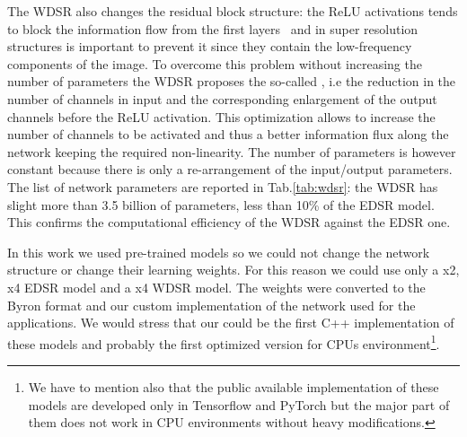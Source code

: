 \documentclass{standalone}
\begin{document}
The WDSR also changes the residual block structure: the ReLU activations tends to block the information flow from the first layers~\cite{mobilenet} and in super resolution structures is important to prevent it since they contain the low-frequency components of the image.
To overcome this problem without increasing the number of parameters the WDSR proposes the so-called , i.e the reduction in the number of channels in input and the corresponding enlargement of the output channels before the ReLU activation.
This optimization allows to increase the number of channels to be activated and thus a better information flux along the network keeping the required non-linearity.
The number of parameters is however constant because there is only a re-arrangement of the input/output parameters.
The list of network parameters are reported in Tab.\ref{tab:wdsr}: the WDSR has slight more than 3.5 billion of parameters, less than 10\% of the EDSR model.
This confirms the computational efficiency of the WDSR against the EDSR one.

In this work we used pre-trained models so we could not change the network structure or change their learning weights.
For this reason we could use only a x2, x4 EDSR model and a x4 WDSR model.
The weights were converted to the Byron format and our custom implementation of the network used for the applications.
We would stress that our could be the first C++ implementation of these models and probably the first optimized version for CPUs environment\footnote{
  We have to mention also that the public available implementation of these models are developed only in Tensorflow and PyTorch but the major part of them does not work in CPU environments without heavy modifications.
}.
\end{document}
